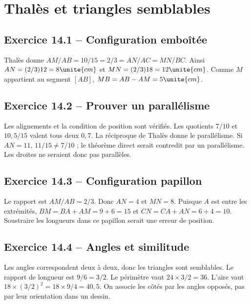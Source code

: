 \chapter{Thalès et triangles semblables}
\label{corriges:14}
\section*{Exercice 14.1 -- Configuration emboîtée}
Thalès donne $AM/AB=10/15=2/3=AN/AC=MN/BC$. Ainsi $AN=(2/3)12=8\unite{cm}$ et $MN=(2/3)18=12\unite{cm}$. Comme $M$ appartient au segment $[AB]$, $MB=AB-AM=5\unite{cm}$.

\section*{Exercice 14.2 -- Prouver un parallélisme}
Les alignements et la condition de position sont vérifiés. Les quotients $7/10$ et $10{,}5/15$ valent tous deux $0{,}7$. La réciproque de Thalès donne le parallélisme. Si $AN=11$, $11/15\ne7/10$ ; le théorème direct serait contredit par un parallélisme. Les droites ne seraient donc pas parallèles.

\section*{Exercice 14.3 -- Configuration papillon}
Le rapport est $AM/AB=2/3$. Donc $AN=4$ et $MN=8$. Puisque $A$ est entre les extrémités, $BM=BA+AM=9+6=15$ et $CN=CA+AN=6+4=10$. Soustraire les longueurs dans ce papillon serait une erreur de position.

\section*{Exercice 14.4 -- Angles et similitude}
Les angles correspondent deux à deux, donc les triangles sont semblables. Le rapport de longueur est $9/6=3/2$. Le périmètre vaut $24\times3/2=36$. L'aire vaut $18\times(3/2)^2=18\times9/4=40{,}5$. On associe les côtés par les angles opposés, pas par leur orientation dans un dessin.

